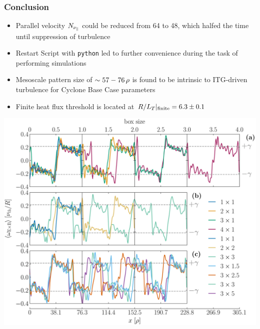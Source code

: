 \documentclass[compress,aspectratio=1610,noflama]{beamer}
\begin{document}
	\begin{frame}
		\frametitle{Conclusion}
		
		\begin{minipage}{0.4\paperwidth}\raggedleft
			\begin{itemize}
				\item <2-> Parallel velocity $N_{\nu_\parallel}$ could be reduced from 64 to 48, which halfed the time until suppression of turbulence
				\item <3-> Restart Script with \texttt{python} led to further convenience during the task of performing simulations
				\item <4-> Mesoscale pattern size of $\sim 57 - 76\,\rho$ is found to be intrinsic to ITG-driven turbulence for Cyclone Base Case parameters
				\item <5-> Finite heat flux threshold is located at $R/L_T|_\mathrm{finite} = 6.3 \pm 0.1$
			\end{itemize}
		\end{minipage}
		\begin{minipage}{0.4\paperwidth}
			 \includegraphics[width = 0.5\paperwidth]{Comparison/Boxsize/S6_rlt6.0_boxsize1-2-3-4x1-1.5-2-2.5-3-5_Ns16_Nvpar48_Nmu9_wexb_comparison_thesis.pdf}
		\end{minipage}
	\end{frame}
\end{document}
